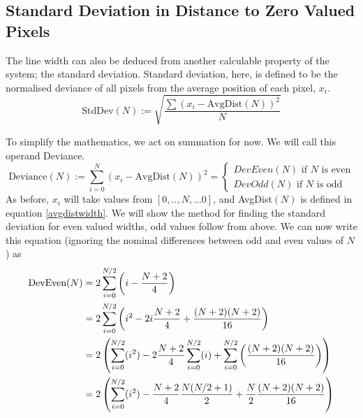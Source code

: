 \documentclass[../main.tex]{subfiles}
\begin{document}
  \subsection{Standard Deviation in Distance to Zero Valued Pixels}
    The line width can also be deduced from another calculable property of the system; the standard deviation.
    Standard deviation, here, is defined to be the normalised deviance of all pixels from the average position of each pixel, $x_i$.
    \[\text{StdDev}(N) := \sqrt{\frac{\sum \left(x_i-\text{AvgDist}(N)\right)^2}{N}}\]
    
    To simplify the mathematics, we act on summation for now.
    We will call this operand Deviance.
    \[\text{Deviance}(N) := \sum_{i=0}^N\left(x_i-\text{AvgDist}(N)\right)^2 =
      \begin{cases}
        DevEven(N) \text{ if } N \text{ is even}\\
        DevOdd(N) \text{ if } N \text{ is odd}
      \end{cases}
    \]
    As before, $x_i$ will take values from $[0,..,N,...0]$, and AvgDist$(N)$ is defined in equation \ref{avgdistwidth}.
    We will show the method for finding the standard deviation for even valued widths, odd values follow from above.
    We can now write this equation (ignoring the nominal differences between odd and even values of $N$) as
    \begin{align}
      \text{DevEven}(N) &= 2\sum_{i=0}^{N/2}\left(i-\frac{N+2}{4}\right)\notag\\
        &=2\sum_{i=0}^{N/2}\left(i^2-2i\frac{N+2}{4}+\frac{(N+2)(N+2)}{16}\right)\notag\\
        &=2\left(\sum_{i=0}^{N/2}(i^2)-2\frac{N+2}{4}\sum_{i=0}^{N/2}(i) + \sum_{i=0}^{N/2}\left(\frac{(N+2)(N+2)}{16}\right)\right)\notag\\
        &=2\left(\sum_{i=0}^{N/2}(i^2)-\frac{N+2}{4}\frac{N(N/2+1)}{2} + \frac{N}{2}\frac{(N+2)(N+2)}{16}\right)
      \label{devianceunfin}
    \end{align}
    
\end{document}
